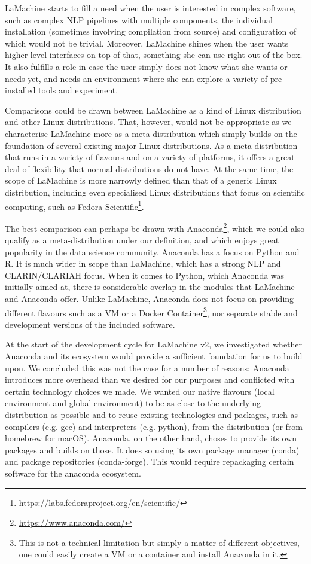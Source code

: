 \documentclass[a4paper,11pt]{article}
\begin{document}
LaMachine starts to fill a need when the user is interested in complex software, such as complex NLP pipelines with
multiple components, the individual installation (sometimes involving compilation from source) and configuration of
which would not be trivial. Moreover, LaMachine shines when the user wants higher-level interfaces on top of that,
something she can use right out of the box. It also fulfills a role in case the user simply does not know what she wants
or needs yet, and needs an environment where she can explore a variety of pre-installed tools and experiment.

Comparisons could be drawn between LaMachine as a kind of Linux distribution and other Linux distributions. That,
however, would not be appropriate as we characterise LaMachine more as a meta-distribution which simply builds on the foundation
of several existing major Linux distributions. As a meta-distribution that runs in a variety of flavours and on a
variety of platforms, it offers a great deal of flexibility that normal distributions do not have. At the same time, the scope of
LaMachine is more narrowly defined than that of a generic Linux distribution, including even specialised Linux
distributions that focus on scientific computing, such as Fedora
Scientific\footnote{\url{https://labs.fedoraproject.org/en/scientific/}}.

The best comparison can perhaps be drawn with Anaconda\footnote{\url{https://www.anaconda.com/}}, which we could also qualify as
a meta-distribution under our definition, and which enjoys great popularity in the data science community. Anaconda has
a focus on Python and R. It is much wider in scope than LaMachine, which has a strong NLP and CLARIN/CLARIAH focus. When
it comes to Python, which Anaconda was initially aimed at, there is considerable overlap in the modules that LaMachine and Anaconda offer. Unlike LaMachine,
Anaconda does not focus on providing different flavours such as a VM or a Docker Container\footnote{This is not a
technical limitation but simply a matter of different objectives, one could easily create a VM or a container and
install Anaconda in it.}, nor separate stable and development versions of the included software.

At the start of the development cycle for LaMachine v2, we investigated whether Anaconda and its ecosystem would provide
a sufficient foundation for us to build upon. We concluded this was not the case for a number of reasons: Anaconda
introduces more overhead than we desired for our purposes and conflicted with certain technology choices we made. We
wanted our native flavours (local environment and global environment) to be as close to the underlying distribution as possible and to reuse existing
technologies and packages, such as compilers (e.g. gcc) and
interpreters (e.g. python), from the distribution (or from homebrew for macOS).  Anaconda, on the other hand, choses to provide its own packages and builds on those. It
does so using its own package manager (conda) and package repositories (conda-forge). This would require repackaging certain software for the
anaconda ecosystem.
\end{document}
